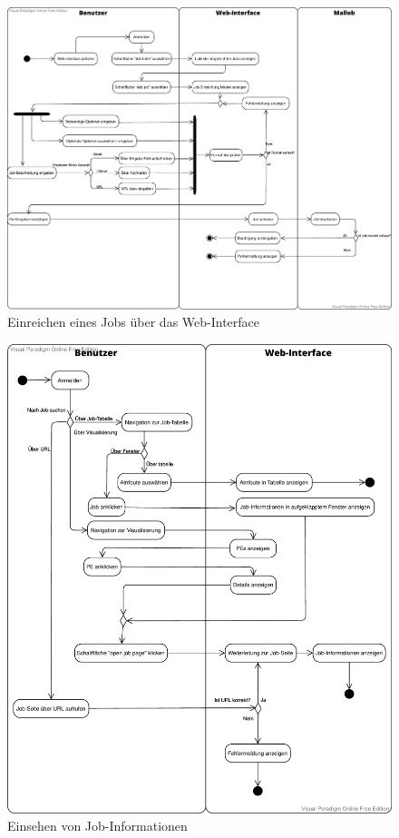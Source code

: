 \begin{figure}[H]
    \centering
    \includegraphics[width=\textwidth]{images-interface/Job_einreichen.pdf}
    \caption{Einreichen eines Jobs über das Web-Interface}
\end{figure}

\begin{figure}[H]
    \centering
    \includegraphics[width=\textwidth]{images-interface/get_infos.pdf}
    \caption{Einsehen von Job-Informationen}
\end{figure}